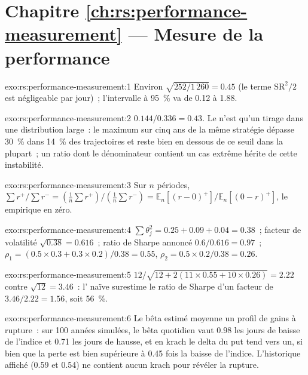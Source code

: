 \section*{Chapitre \ref{ch:rs:performance-measurement} --- Mesure de la performance}

\begin{solution}{exo:rs:performance-measurement:1}
Environ $\sqrt{252/1\,260} = 0.45$ (le terme $\mathrm{SR}^2/2$ est négligeable par jour)~; l'intervalle à 95~\% va de 0.12 à 1.88.
\end{solution}

\begin{solution}{exo:rs:performance-measurement:2}
$0.144/0.336 = 0.43$. Le  n'est qu'un tirage dans une distribution large~: le maximum sur cinq ans de la même stratégie dépasse 30~\% dans 14~\% des trajectoires et reste
bien en dessous de ce seuil dans la plupart~; un ratio dont le dénominateur contient un cas extrême hérite de cette instabilité.
\end{solution}

\begin{solution}{exo:rs:performance-measurement:3}
Sur $n$ périodes, $\sum r^+ / \sum r^- = (\frac1n\sum r^+)/(\frac1n\sum r^-) = \mathbb{E}_n[(r - 0)^+]/\mathbb{E}_n[(0 - r)^+]$, le  empirique en zéro.
\end{solution}

\begin{solution}{exo:rs:performance-measurement:4}
$\sum\theta_j^2 = 0.25 + 0.09 + 0.04 = 0.38$~; facteur de volatilité $\sqrt{0.38} = 0.616$~; ratio de Sharpe annoncé $0.6/0.616 = 0.97$~;
$\rho_1 = (0.5 \times 0.3 + 0.3 \times 0.2)/0.38 = 0.55$, $\rho_2 = 0.5 \times 0.2/0.38 = 0.26$.
\end{solution}

\begin{solution}{exo:rs:performance-measurement:5}
$12/\sqrt{12 + 2(11 \times 0.55 + 10 \times 0.26)} = 2.22$ contre $\sqrt{12} = 3.46$~: l' naïve surestime le ratio de Sharpe d'un facteur de
$3.46/2.22 = 1.56$, soit 56~\%.
\end{solution}

\begin{solution}{exo:rs:performance-measurement:6}
Le bêta estimé moyenne un profil de gains à rupture~: sur 100 années simulées, le bêta quotidien vaut 0.98 les jours de baisse de l'indice et 0.71 les jours de hausse, et en krach le delta du put
tend vers un, si bien que la perte est bien supérieure à 0.45 fois la baisse de l'indice. L'historique affiché (0.59 et 0.54) ne contient aucun krach pour révéler la rupture.
\end{solution}

